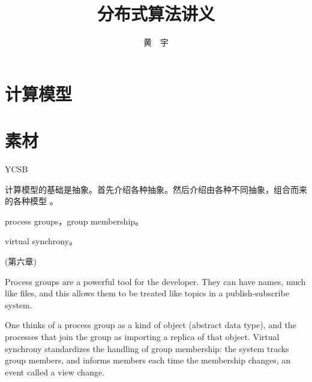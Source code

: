 \documentclass[UTF8]{ctexrep}
\newcommand{\mybreak}{\vspace{1cm}}
\begin{document}
\title{\bf 分布式算法讲义}

\author{黄\ \ 宇}

\maketitle

\tableofcontents


\chapter{计算模型}



\chapter*{素材}


YCSB \cite{Cooper10, YCSB-github}


\mybreak

计算模型的基础是抽象。首先介绍各种抽象。然后介绍由各种不同抽象，组合而来的各种模型 \cite{Cachin11}。


\mybreak

process groups，group membership。

virtual synchrony。

\cite{Bost10} (第六章)

Process groups are a powerful tool for the developer. They can have names, much like files, and this allows them to be treated like topics in a publish-subscribe system. 

One thinks of a process group as a kind of object (abstract data type), and the processes that join the group as importing a replica of that object. Virtual synchrony standardizes the handling of group membership: the system tracks group members, and informs members each time the membership changes, an event called a view change.







\end{document}
